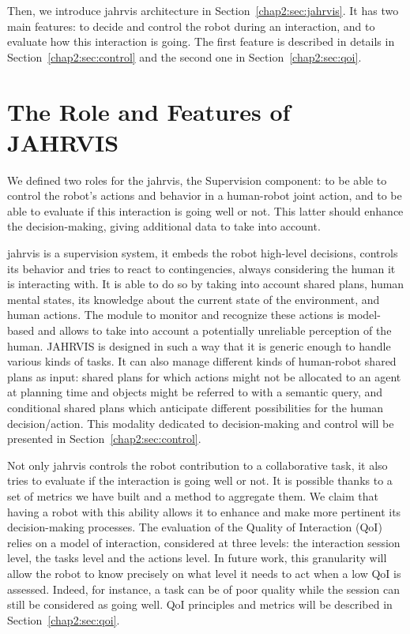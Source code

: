 \documentclass[a4paper,11pt,twoside]{StyleThese}
\begin{document}
Then, we introduce \acrshort{jahrvis} architecture in Section~\ref{chap2:sec:jahrvis}. It has two main features: to decide and control the robot during an interaction, and to evaluate how this interaction is going. The first feature is described in details in Section~\ref{chap2:sec:control} and the second one in Section~\ref{chap2:sec:qoi}.

\section{The Role and Features of JAHRVIS}\label{chap2:sec:sup_features}

We defined two roles for the \acrshort{jahrvis}, the Supervision component: to be able to control the robot's actions and behavior in a human-robot joint action, and to be able to evaluate if this interaction is going well or not. This latter should enhance the decision-making, giving additional data to take into account. 

\acrshort{jahrvis} is a supervision system, \ie it embeds the robot high-level decisions, controls its behavior and tries to react to contingencies, always considering the human it is interacting with. It is able to do so by taking into account shared plans, human mental states, its knowledge about the current state of the environment, and human actions. The module to monitor and recognize these actions is model-based and allows to take into account a potentially unreliable perception of the human. JAHRVIS is designed in such a way that it is generic enough to handle various kinds of tasks. It can also manage  different kinds of human-robot shared plans as input: shared plans for which actions might not be allocated to an agent at planning time and objects might be referred to with a semantic query, and conditional shared plans which anticipate different possibilities for the human decision/action. This modality dedicated to decision-making and control will be presented in Section~\ref{chap2:sec:control}.

Not only \acrshort{jahrvis} controls the robot contribution to a collaborative task, it also tries to evaluate if the interaction is going well or not. It is possible thanks to a set of metrics we have built and a method to aggregate them. We claim that having a robot with this ability allows it to enhance and make more pertinent its decision-making processes. The evaluation of the Quality of Interaction (QoI) relies on a model of interaction, considered at  three levels: the interaction session level, the tasks level and the actions level. In future work, this granularity will allow the robot to know precisely on what level it needs to act when a low QoI is assessed. Indeed, for instance, a task can be of poor quality while the session can still be considered as going well. QoI principles and metrics will be described in Section~\ref{chap2:sec:qoi}.
\end{document}
